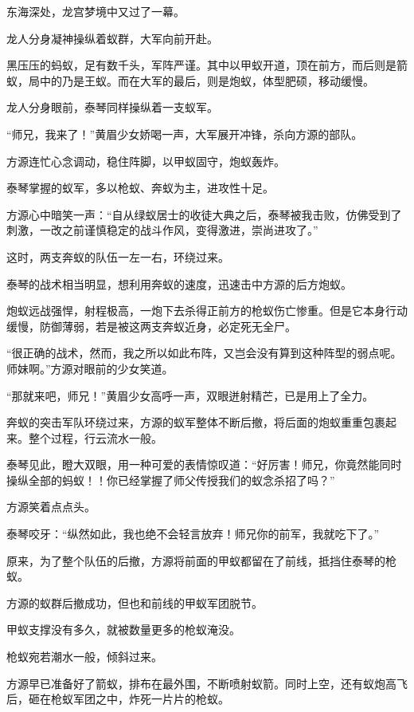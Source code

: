 
\begin{this_body}

东海深处，龙宫梦境中又过了一幕。

龙人分身凝神操纵着蚁群，大军向前开赴。

黑压压的蚂蚁，足有数千头，军阵严谨。其中以甲蚁开道，顶在前方，而后则是箭蚁，局中的乃是王蚁。而在大军的最后，则是炮蚁，体型肥硕，移动缓慢。

龙人分身眼前，泰琴同样操纵着一支蚁军。

“师兄，我来了！”黄眉少女娇喝一声，大军展开冲锋，杀向方源的部队。

方源连忙心念调动，稳住阵脚，以甲蚁固守，炮蚁轰炸。

泰琴掌握的蚁军，多以枪蚁、奔蚁为主，进攻性十足。

方源心中暗笑一声：“自从绿蚁居士的收徒大典之后，泰琴被我击败，仿佛受到了刺激，一改之前谨慎稳定的战斗作风，变得激进，崇尚进攻了。”

这时，两支奔蚁的队伍一左一右，环绕过来。

泰琴的战术相当明显，想利用奔蚁的速度，迅速击中方源的后方炮蚁。

炮蚁远战强悍，射程极高，一炮下去杀得正前方的枪蚁伤亡惨重。但是它本身行动缓慢，防御薄弱，若是被这两支奔蚁近身，必定死无全尸。

“很正确的战术，然而，我之所以如此布阵，又岂会没有算到这种阵型的弱点呢。师妹啊。”方源对眼前的少女笑道。

“那就来吧，师兄！”黄眉少女高呼一声，双眼迸射精芒，已是用上了全力。

奔蚁的突击军队环绕过来，方源的蚁军整体不断后撤，将后面的炮蚁重重包裹起来。整个过程，行云流水一般。

泰琴见此，瞪大双眼，用一种可爱的表情惊叹道：“好厉害！师兄，你竟然能同时操纵全部的蚂蚁！！你已经掌握了师父传授我们的蚁念杀招了吗？”

方源笑着点点头。

泰琴咬牙：“纵然如此，我也绝不会轻言放弃！师兄你的前军，我就吃下了。”

原来，为了整个队伍的后撤，方源将前面的甲蚁都留在了前线，抵挡住泰琴的枪蚁。

方源的蚁群后撤成功，但也和前线的甲蚁军团脱节。

甲蚁支撑没有多久，就被数量更多的枪蚁淹没。

枪蚁宛若潮水一般，倾斜过来。

方源早已准备好了箭蚁，排布在最外围，不断喷射蚁箭。同时上空，还有蚁炮高飞后，砸在枪蚁军团之中，炸死一片片的枪蚁。


\end{this_body}
